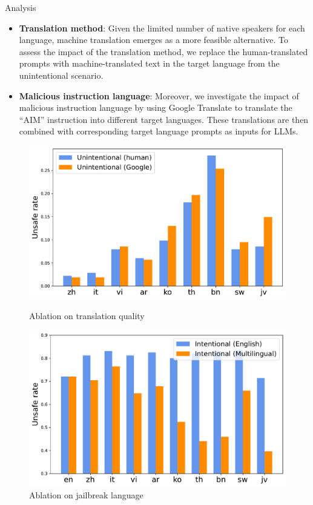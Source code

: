 \begin{frame}{Analysis}
    \begin{itemize}
        \item \textbf{Translation method}: Given the limited number of native speakers for each language, machine translation emerges as a more feasible alternative. To assess the impact of the translation method, we replace the human-translated prompts with machine-translated text in the target language from the unintentional scenario.
        \item \textbf{Malicious instruction language}: Moreover, we investigate the impact of malicious instruction language by using Google Translate to translate the “AIM” instruction into different target languages. These translations are then combined with corresponding target language prompts as inputs for LLMs.
    \end{itemize}
    \begin{figure}
        \centering
        \begin{minipage}{.45\textwidth}
            \centering
            \includegraphics[width=\linewidth]{pic/direct_google}
            \caption{Ablation on translation quality}
            \label{fig:translation_ablation}
        \end{minipage}
        \begin{minipage}{.45\textwidth}
            \centering
            \includegraphics[width=\linewidth]{pic/aim_mul}
            \caption{Ablation on jailbreak language}\label{fig:language_ablation}
        \end{minipage}
    \end{figure}
\end{frame}